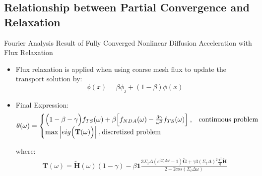 \subsection{Relationship between Partial Convergence and Relaxation}
\begin{frame}{Fourier Analysis Result of Fully Converged Nonlinear Diffusion Acceleration with Flux Relaxation}

\begin{itemize}
    \item Flux relaxation is applied when using coarse mesh flux to update the transport solution by:
    \begin{equation}
        \phi(x)=\beta\phi_j+(1-\beta)\phi(x)
    \end{equation}
    \item Final Expression:
    \begin{align}\label{eqns:four-theta}
     \theta(\omega)=
        \begin{cases}
        \Big( 1-\beta-\gamma \Big)f_{TS}(\omega)
        +\beta\Big[ f_{NDA}(\omega)-\frac{3\gamma}{\omega^2}f_{TS}(\omega) \Big] \;, &\text{continuous problem}\\
            \max \Big| eig\Big( \mathbf{T}(\omega) \Big) \Big|\;, \text{discretized problem}
        \end{cases}
\end{align}

    where:
    \begin{align}
    \mathbf{T}(\omega)=\tilde{\mathbf{H}}(\omega)(1-\gamma)-\beta\mathbf{1}\frac{3\Sigma_t\Delta(e^{i\Sigma_t\Delta\omega}-1)\tilde{\mathbf{G}}+\gamma3(\Sigma_t\Delta)^2\frac{\mathbf{1}^T}{q}\tilde{\mathbf{H}}}{2-2cos(\Sigma_t\Delta\omega)} \label{eq:eror_tr_mtx}
    \end{align} 
\end{itemize}  
\end{frame}

